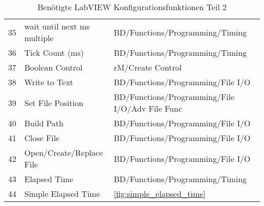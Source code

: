 \begin{table}[h!]
\caption{Benötigte LabVIEW Konfigurationsfunktionen Teil 2}
\begin{center}

\begin{tabularx}{1\textwidth}{m{0.5cm}m{4.5cm}X}
\hline

35 & wait until next ms multiple & BD/Functions/Programming/Timing \\
36 & Tick Count (ms) & BD/Functions/Programming/Timing \\
37 & Boolean Control & rM/Create Control \\
38 & Write to Text & BD/Functions/Programming/File I/O \\
39 & Set File Position & BD/Functions/Programming/File I/O/Adv File Func \\
40 & Build Path & BD/Functions/Programming/File I/O \\
41 & Close File & BD/Functions/Programming/File I/O \\
42 & Open/Create/Replace File & BD/Functions/Programming/File I/O \\
43 & Elapsed Time & BD/Functions/Programming/Timing \\
44 & Simple Elapsed Time & \ref{fig:simple_elapsed_time}

\end{tabularx}
\end{center}
\label{tab:labviewserialobject}
\end{table}